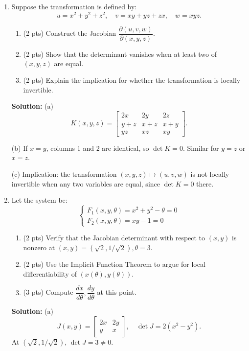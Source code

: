 \documentclass[12pt]{article}
\begin{document}
\begin{enumerate}
\item
Suppose the transformation is defined by:
\[
u = x^2 + y^2 + z^2, \quad v = xy + yz + zx, \quad w = xyz.
\]
\begin{enumerate}[label=(\alph*),topsep=2pt,itemsep=2pt]
\item (2 pts) Construct the Jacobian $\dfrac{\partial(u,v,w)}{\partial(x,y,z)}$.  
\item (2 pts) Show that the determinant vanishes when at least two of $(x,y,z)$ are equal.  
\item (2 pts) Explain the implication for whether the transformation is locally invertible.  
\end{enumerate}

\textbf{Solution:}  
(a) 
\[
K(x,y,z)=
\begin{bmatrix}
2x & 2y & 2z\\
y+z & x+z & x+y\\
yz & xz & xy
\end{bmatrix}.
\]

(b) If $x=y$, columns 1 and 2 are identical, so $\det K=0$. Similar for $y=z$ or $x=z$.

(c) Implication: the transformation $(x,y,z)\mapsto(u,v,w)$ is not locally invertible when any two variables are equal, since $\det K=0$ there.



\item 
Let the system be:
\[
\begin{cases}
F_1(x,y,\theta) = x^2 + y^2 - \theta = 0 \\
F_2(x,y,\theta) = xy - 1 = 0
\end{cases}
\]
\begin{enumerate}[label=(\alph*),topsep=2pt,itemsep=2pt]
\item (2 pts) Verify that the Jacobian determinant with respect to $(x,y)$ is nonzero at $(x,y)=(\sqrt{2}, 1/\sqrt{2}), \theta=3$.  
\item (2 pts) Use the Implicit Function Theorem to argue for local differentiability of $(x(\theta),y(\theta))$.  
\item (3 pts) Compute $\dfrac{dx}{d\theta}, \dfrac{dy}{d\theta}$ at this point.  
\end{enumerate}

\textbf{Solution:}  
(a) 
\[
J(x,y)=
\begin{bmatrix}
2x & 2y\\
y & x
\end{bmatrix},\quad
\det J=2(x^2-y^2).
\]
At $(\sqrt{2},1/\sqrt{2})$, $\det J=3\neq 0$.


\end{enumerate}
\end{document}
